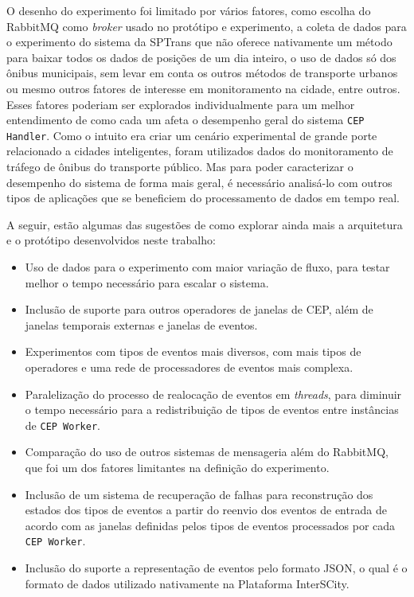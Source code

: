 O desenho do experimento foi limitado por vários fatores, como escolha do RabbitMQ como \textit{broker} usado no protótipo e experimento, a coleta de dados para o experimento do sistema da SPTrans que não oferece nativamente um método para baixar todos os dados de posições de um dia inteiro, o uso de dados só dos ônibus municipais, sem levar em conta os outros métodos de transporte urbanos ou mesmo outros fatores de interesse em monitoramento na cidade, entre outros. Esses fatores poderiam ser explorados individualmente para um melhor entendimento de como cada um afeta o desempenho geral do sistema  \texttt{CEP Handler}. %
Como o intuito era criar um cenário experimental de grande porte relacionado a cidades inteligentes, foram utilizados dados do monitoramento de tráfego de ônibus do transporte público. Mas para poder caracterizar o desempenho do sistema de forma mais geral, é necessário analisá-lo com outros tipos de aplicações que se beneficiem do processamento de dados em tempo real. 

A seguir, estão algumas das sugestões de como explorar ainda mais a arquitetura e o protótipo desenvolvidos neste trabalho:

\begin{itemize}
    \item Uso de dados para o experimento com maior variação de fluxo, para testar melhor o tempo necessário para escalar o sistema.
    \item Inclusão de suporte para outros operadores de janelas de CEP, além de janelas temporais externas e janelas de eventos.
    \item Experimentos com tipos de eventos mais diversos, com mais tipos de operadores e uma rede de processadores de eventos mais complexa.
    \item Paralelização do processo de realocação de eventos em \textit{threads}, para diminuir o tempo necessário para a redistribuição de tipos de eventos entre instâncias de \texttt{CEP Worker}.
    \item Comparação do uso de outros sistemas de mensageria além do RabbitMQ, que foi um dos fatores limitantes na definição do experimento.
    \item Inclusão de um sistema de recuperação de falhas para reconstrução dos estados dos tipos de eventos a partir do reenvio dos eventos de entrada de acordo com as janelas definidas pelos tipos de eventos processados por cada \texttt{CEP Worker}.
    \item Inclusão do suporte a representação de eventos pelo formato JSON, o qual é o formato de dados utilizado nativamente na Plataforma InterSCity.
\end{itemize}

